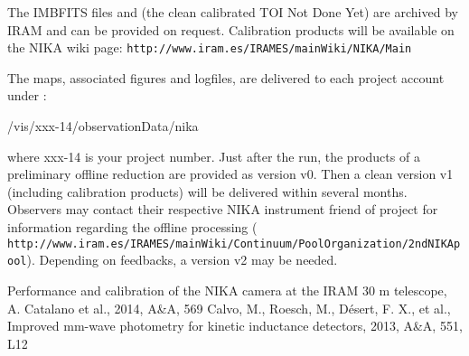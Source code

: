 \documentclass[a4paper,10pt]{article}
\begin{document}
The IMBFITS files and (the clean calibrated TOI Not Done Yet) are archived by
IRAM and can be provided on request. Calibration products will be available on
the NIKA wiki page: {\tt http://www.iram.es/IRAMES/mainWiki/NIKA/Main}

The maps, associated figures and logfiles, are delivered to each project
account under :

/vis/xxx-14/observationData/nika 

where xxx-14 is your project number.  Just after the run, the products of a
preliminary offline reduction are provided as version v0. Then a clean version
v1 (including calibration products) will be delivered within several
months. Observers may contact their respective NIKA instrument friend of
project for information regarding the offline processing ({\tt
  http://www.iram.es/IRAMES/mainWiki/Continuum/PoolOrganization/2ndNIKApool}). Depending
on feedbacks, a version v2 may be needed.
 

\begin{thebibliography}{}
    Performance and calibration of the NIKA camera at
     the IRAM 30 m telescope, A. Catalano et al., 2014, A\&A, 569
    Calvo, M., Roesch, M., D\'esert, F. X., et al., Improved mm-wave photometry for kinetic inductance detectors, 2013, A\&A, 551, L12
\end{thebibliography}
\end{document}
